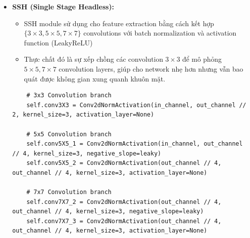 \documentclass[12pt, a4paper, oneside]{book}
\theoremstyle{plain}
\numberwithin{equation}{chapter} \DeclareMathOperator{\Var}{var}
\begin{document}
\begin{itemize}
\begin{lstlisting}
    return [output1, output2, output3]

    \end{lstlisting}
    \item[--] \textbf{SSH (Single Stage Headless):}
    \begin{itemize}
        \item [+] SSH module sử dụng cho feature extraction bằng cách kết hợp \(\{3 \times 3, 5 \times 5, 7 \times 7\}\) convolutions với batch normalization và activation function (LeakyReLU)
        \item [+] Thực chất đó là sự xếp chồng các convolution \(3 \times 3\) để mô phỏng \(5 \times 5, 7 \times 7 \) convolution layers, giúp cho network nhẹ hơn nhưng vẫn bao quát được không gian xung quanh khuôn mặt. 
    \end{itemize}
    \begin{lstlisting}
    # 3x3 Convolution branch
    self.conv3X3 = Conv2dNormActivation(in_channel, out_channel // 2, kernel_size=3, activation_layer=None)

    # 5x5 Convolution branch
    self.conv5X5_1 = Conv2dNormActivation(in_channel, out_channel // 4, kernel_size=3, negative_slope=leaky)
    self.conv5X5_2 = Conv2dNormActivation(out_channel // 4, out_channel // 4, kernel_size=3, activation_layer=None)

    # 7x7 Convolution branch
    self.conv7X7_2 = Conv2dNormActivation(out_channel // 4, out_channel // 4, kernel_size=3, negative_slope=leaky)
    self.conv7X7_3 = Conv2dNormActivation(out_channel // 4, out_channel // 4, kernel_size=3, activation_layer=None)  
    \end{lstlisting}
\end{itemize}
\end{document}
